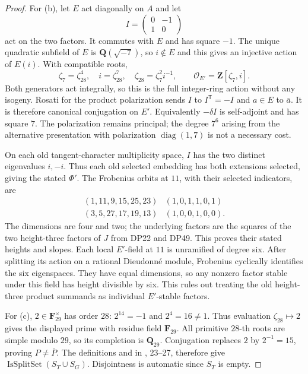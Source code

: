 \documentclass[11pt,a4paper]{article}
\theoremstyle{definition}\newtheorem{remark}[theorem]{Remark}
\begin{document}
\begin{proof}
For (b), let $E$ act diagonally on $A$ and let
\[
 I=\begin{pmatrix}0&-1\\1&0\end{pmatrix}
\]
act on the two factors. It commutes with $E$ and has square $-1$.
The unique quadratic subfield of $E$ is $\mathbf Q(\sqrt{-7})$,
so $i\notin E$ and this gives an injective action of $E(i)$.
With compatible roots,
\[
 \zeta _7=\zeta _{28}^4,\quad i=\zeta _{28}^7,\quad
 \zeta _{28}=\zeta _7^2i^{-1},\qquad
 \mathcal O_{E'}=\mathbf Z[\zeta _7,i].
\]
Both generators act integrally, so this is the full integer-ring
action without any isogeny.
Rosati for the product polarization sends $I$ to
$I^{\mathsf T}=-I$ and $a\in E$ to $\bar a$.
It is therefore canonical conjugation on $E'$.
Equivalently $-\delta I$ is self-adjoint and has square $7$.
The polarization remains principal; the degree $7^6$ arising from
the alternative presentation with polarization
$\operatorname{diag}(1,7)$ is not a necessary cost.

On each old tangent-character multiplicity space, $I$ has the
two distinct eigenvalues $i,-i$. Thus each old selected embedding
has both extensions selected, giving the stated $\Phi'$.
The Frobenius orbits at $11$, with their selected indicators, are
\[
 \begin{array}{c|c}
 (1,11,9,15,25,23)&(1,0,1,1,0,1)\\
 (3,5,27,17,19,13)&(1,0,0,1,0,0).
 \end{array}
\]
The dimensions are four and two; the underlying factors are the
squares of the two height-three factors of $J$ from DP22 and DP49.
This proves their stated heights and slopes.
Each local $E'$-field at $11$ is unramified of degree six.
After splitting its action on a rational Dieudonné module,
Frobenius cyclically identifies the six eigenspaces. They have
equal dimensions, so any nonzero factor stable under this field
has height divisible by six. This rules out treating the old
height-three product summands as individual $E'$-stable factors.

For (c), $2\in\mathbf F_{29}^\times$ has order $28$:
$2^{14}=-1$ and $2^4=16\ne1$.
Thus evaluation $\zeta _{28}\mapsto2$ gives the displayed prime
with residue field $\mathbf F_{29}$.
All primitive $28$-th roots are simple modulo $29$, so its
completion is $\mathbf Q_{29}$.
Conjugation replaces $2$ by $2^{-1}=15$, proving $P\ne\bar P$.
The definitions  and  in
,
23--27, therefore give
$\operatorname{IsSplitSet}(S_T\cup S_G)$.
Disjointness is automatic since $S_T$ is empty.


\end{proof}
\end{document}
